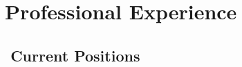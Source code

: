 \documentclass[10pt, a4paper, english]{cv-public}
\begin{document}

\vspace{10pt}
\section*{\faBriefcase \ Professional Experience}


\subsection*{\faBuilding\ \ Current Positions \ }
\end{document}
